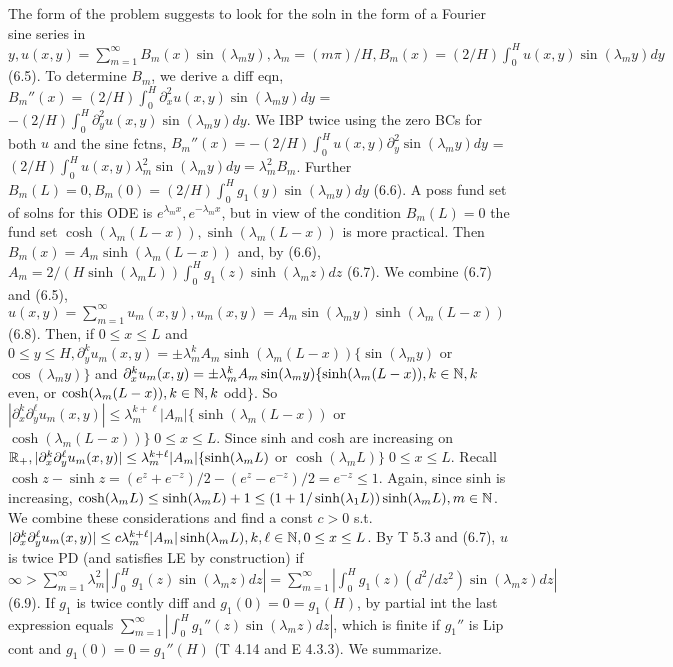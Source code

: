 The form of the problem suggests to look for the soln in the form of a Fourier sine series in $y, u(x,y) = \sum_{m=1}^{\infty}B_m(x) \sin(\lambda_m y), \lambda_m = (m \pi) / H, B_m(x)=(2/H)\int_0^H u(x,y) \sin(\lambda_m y) dy$ (6.5). To determine $B_m$, we derive a diff eqn, $B_m''(x) = (2/H)\int_0^H \partial_x^2 u(x,y) \sin(\lambda_m y) dy$ = $- (2/H)\int_0^H \partial_y^2 u(x,y) \sin(\lambda_m y) dy$. We IBP twice using the zero BCs for both $u$ and the sine fctns, $B_m''(x) = -(2/H) \int_0^H  u(x,y) \partial_y^2 \sin(\lambda_m y) dy$ = $(2/H) \int_0^H  u(x,y) \lambda_m^2 \sin(\lambda_m y) dy = \lambda_m^2 B_m$. Further $B_m(L)=0, B_m(0) = (2/H)\int_0^H  g_1(y)  \sin(\lambda_m y) dy$ (6.6). A poss fund set of solns for this ODE is $e^{\lambda_m x}, e^{- \lambda_m x}$, but in view of the condition $B_m(L)=0$ the fund set $\cosh(\lambda_m (L-x)), \sinh(\lambda_m (L-x))$ is more practical.  Then $B_m(x)= A_m \sinh(\lambda_m (L-x))$ and, by (6.6), $A_m = 2/(H \sinh(\lambda_m L)) \int_0^H g_1(z) \sinh(\lambda_m z) dz$ (6.7). We combine (6.7) and (6.5), $u(x,y)= \sum_{m=1}^{\infty} u_m(x,y), u_m(x,y)= A_m \sin(\lambda_m y) \sinh(\lambda_m (L-x))$ (6.8). Then, if $0 \leq x \leq L$ and $0 \leq y \leq H, \partial_y^k u_m(x,y) = \pm \lambda_m^k A_m \sinh(\lambda_m (L-x))\{\sin(\lambda_m y)$ or $ \cos(\lambda_m y)\}$ and $\partial_x^k u_m(x,y) = \pm \lambda_m^k A_m \sin(\lambda_m y) \{\sinh(\lambda_m(L-x)), k \in \mathbb{N}, k$ even,  or $ \cosh(\lambda_m (L-x)), k \in \mathbb{N}, k$ odd$\}$. So $|\partial_x^k \partial_y^{\ell} u_m(x,y)| \leq \lambda_m^{k+\ell} |A_m| \{\sinh(\lambda_m(L-x))$ or $ \cosh(\lambda_m (L-x))\}\; 0 \leq x \leq L$. Since sinh and cosh are increasing on $\mathbb{R}_+, |\partial_x^k \partial_y^{\ell} u_m(x,y)| \leq \lambda_m^{k+\ell} |A_m| \{\sinh(\lambda_m L)$ or $ \cosh(\lambda_m L)\}\; 0 \leq x \leq L$. Recall $\cosh z - \sinh z = (e^z + e^{-z})/2- (e^z - e^{-z})/2 = e^{-z} \leq 1$. Again, since sinh is increasing, $\cosh(\lambda_m L) \leq \sinh(\lambda_m L) + 1 \leq (1 + 1/\sinh(\lambda_1 L))\sinh(\lambda_m L), m \in \mathbb{N}$. We combine these considerations and find a const $c > 0$ s.t. $|\partial_x^k \partial_y^{\ell} u_m(x,y)| \leq c \lambda_m^{k+\ell} |A_m| \sinh(\lambda_m L), k, \ell \in \mathbb{N}, 0 \leq x \leq L$. By T 5.3 and (6.7), $u$ is twice PD (and satisfies LE by construction) if $ \infty > \sum_{m=1}^{\infty} \lambda_m^2 |\int_0^H g_1(z) \sin(\lambda_m z) dz| = \sum_{m=1}^{\infty} |\int_0^H g_1(z) (d^2/dz^2)\sin(\lambda_m z) dz|$ (6.9). If $g_1$ is twice contly diff and $g_1(0)=0=g_1(H)$, by partial int the last expression equals $\sum_{m=1}^{\infty}  |\int_0^H g_1''(z) \sin(\lambda_m z) dz|$, which is finite if $g_1''$ is Lip cont and $g_1(0)=0=g_1''(H)$ (T 4.14 and E 4.3.3). We summarize. 